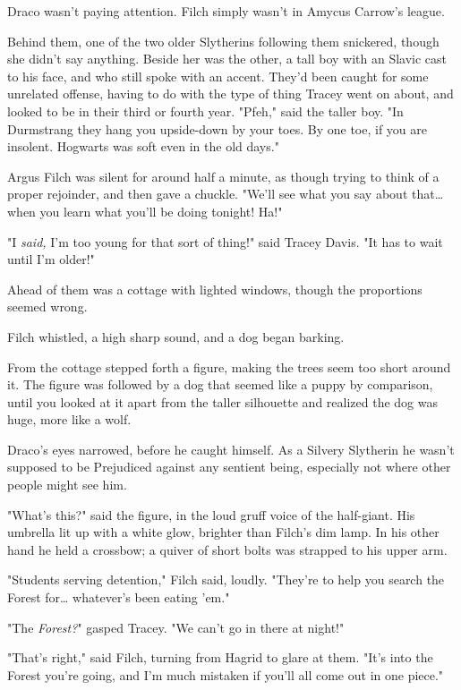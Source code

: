 Draco wasn't paying attention. Filch simply wasn't in Amycus Carrow's league.

Behind them, one of the two older Slytherins following them snickered, though 
she didn't say anything. Beside her was the other, a tall boy with an Slavic 
cast to his face, and who still spoke with an accent. They'd been caught for 
some unrelated offense, having to do with the type of thing Tracey went on 
about, and looked to be in their third or fourth year. "Pfeh," said the taller 
boy. "In Durmstrang they hang you upside-down by your toes. By one toe, if you 
are insolent. Hogwarts was soft even in the old days."

Argus Filch was silent for around half a minute, as though trying to think of a 
proper rejoinder, and then gave a chuckle. "We'll see what you say about 
that{\ldots} when you learn what you'll be doing tonight! Ha!"

"I \emph{said,} I'm too young for that sort of thing!" said Tracey Davis. "It 
has to wait until I'm older!"

Ahead of them was a cottage with lighted windows, though the proportions seemed 
wrong.

Filch whistled, a high sharp sound, and a dog began barking.

From the cottage stepped forth a figure, making the trees seem too short around 
it. The figure was followed by a dog that seemed like a puppy by comparison, 
until you looked at it apart from the taller silhouette and realized the dog 
was huge, more like a wolf.

Draco's eyes narrowed, before he caught himself. As a Silvery Slytherin he 
wasn't supposed to be Prejudiced against any sentient being, especially not 
where other people might see him.

"What's this?" said the figure, in the loud gruff voice of the half-giant. His 
umbrella lit up with a white glow, brighter than Filch's dim lamp. In his other 
hand he held a crossbow; a quiver of short bolts was strapped to his upper arm.

"Students serving detention," Filch said, loudly. "They're to help you search 
the Forest for… whatever's been eating 'em."

"The \emph{Forest?}" gasped Tracey. "We can't go in there at night!"

"That's right," said Filch, turning from Hagrid to glare at them. "It's into 
the Forest you're going, and I'm much mistaken if you'll all come out in one 
piece."

